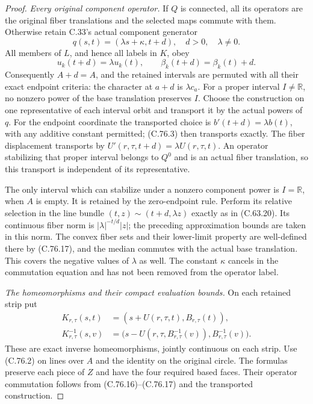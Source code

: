 \begin{proof}
\emph{Every original component operator.}
If $Q$ is connected, all its operators are the original
fiber translations and the selected maps commute with
them. Otherwise retain C.33's actual component generator
\[
                 q(s,t)=(\lambda s+\kappa,t+d),
                         \quad d>0,\quad\lambda\ne0.
                                                               \tag{C.76.16}
\]
All members of $L$, and hence all labels in $K$, obey
\[
       u_k(t+d)=\lambda u_k(t),\qquad
       \beta_k(t+d)=\beta_k(t)+d.
                                                               \tag{C.76.17}
\]
Consequently $A+d=A$, and the retained intervals are
permuted with all their exact endpoint criteria: the
character at $a+d$ is $\lambda c_a$.
For a proper interval $I\ne\mathbb R$, no nonzero power
of the base translation preserves $I$. Choose the
construction on one representative of each interval
orbit and transport it by the actual powers of $q$.
For the endpoint coordinate the transported choice is
$b'(t+d)=\lambda b(t)$, with any additive constant
permitted; (C.76.3) then transports exactly. The fiber
displacement transports by $U'(r,\tau,t+d)=\lambda U(r,\tau,t)$.
An operator stabilizing that proper interval belongs
to $Q^0$ and is an actual fiber translation, so this
transport is independent of its representative.

The only interval which can stabilize under a nonzero
component power is $I=\mathbb R$, when $A$ is empty.
It is retained by the zero-endpoint rule. Perform its
relative selection in the line bundle
$(t,z)\sim(t+d,\lambda z)$ exactly as in (C.63.20).
Its continuous fiber norm is $|\lambda|^{-t/d}|z|$;
the preceding approximation bounds are taken in this
norm. The convex fiber sets and their lower-limit
property are well-defined there by (C.76.17), and the
median commutes with the actual base translation.
This covers the negative values of $\lambda$ as well.
The constant $\kappa$ cancels in the commutation equation
and has not been removed from the operator label.

\emph{The homeomorphisms and their compact evaluation bounds.}
On each retained strip put
\[
 \begin{split}
 K_{r,\tau}(s,t)&=(s+U(r,\tau,t),B_{r,\tau}(t)),\\
 K_{r,\tau}^{-1}(s,v)&=
 \bigl(s-U(r,\tau,B_{r,\tau}^{-1}(v)),B_{r,\tau}^{-1}(v)\bigr).
 \end{split}
                                                               \tag{C.76.18}
\]
These are exact inverse homeomorphisms, jointly continuous
on each strip. Use (C.76.2) on lines over $A$ and the
identity on the original circle. The formulas preserve
each piece of $Z$ and have the four required based faces.
Their operator commutation follows from (C.76.16)--(C.76.17)
and the transported construction.


\end{proof}
